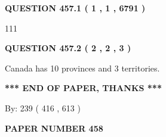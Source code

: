 \documentclass[12pt]{article}
\begin{document}
 
 
 
   
   
  
\vspace{0.2in}
  
{\textbf{\Large{QUESTION
457.1 
 ( 1 , 1 , 6791 )
}}}
  
  
 
 
\noindent{}

111
 
 
  
\vspace{0.2in}
  
{\textbf{\Large{QUESTION
457.2 
 ( 2 , 2 , 3 )
}}}
  
  
 
 
\noindent{}
 
 
Canada has 10  provinces and 3 territories.
 
 
 
 
   
   
 \vspace{0.2in}
 
   
   
   
   
\vspace{1.0in} 
{\textbf{\large{ *** END OF PAPER, THANKS *** }}} 
   
   
\hspace{1.0in} By: 
 239 ( 416 ,  613 )
   
   
   
   
\newpage 
\setcounter{page}{ 
   458001 } 
   
   
   
   
 {\textbf{ \Large{ PAPER NUMBER  458  }}}
   
   
\vspace{0.2in}
   
   
   
   
   
   
 \vspace{0.2in}
 
 
 
 
   
   
  
\vspace{0.2in}
  
\end{document}
